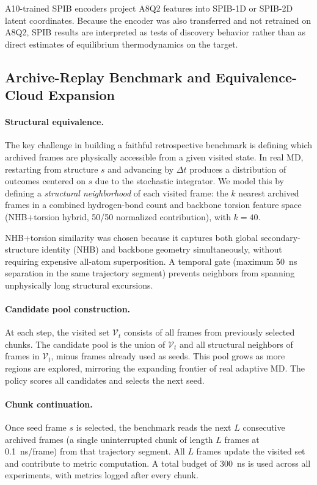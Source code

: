 A10-trained SPIB encoders project A8Q2 features into SPIB-1D or SPIB-2D latent coordinates.\cite{wang2021spib}
Because the encoder was also transferred and not retrained on A8Q2, SPIB results are interpreted as tests of discovery behavior rather than as direct estimates of equilibrium thermodynamics on the target.

\subsection{Archive-Replay Benchmark and Equivalence-Cloud Expansion}
\label{sec:methods_equiv}

\paragraph{Structural equivalence.}
The key challenge in building a faithful retrospective benchmark is defining which archived frames are physically accessible from a given visited state.
In real MD, restarting from structure $s$ and advancing by $\Delta t$ produces a distribution of outcomes centered on $s$ due to the stochastic integrator.
We model this by defining a \emph{structural neighborhood} of each visited frame: the $k$ nearest archived frames in a combined hydrogen-bond count and backbone torsion feature space (NHB+torsion hybrid, 50/50 normalized contribution), with $k=40$.

NHB+torsion similarity was chosen because it captures both global secondary-structure identity (NHB) and backbone geometry simultaneously, without requiring expensive all-atom superposition.
A temporal gate (maximum 50~ns separation in the same trajectory segment) prevents neighbors from spanning unphysically long structural excursions.

\paragraph{Candidate pool construction.}
At each step, the visited set $\mathcal{V}_t$ consists of all frames from previously selected chunks.
The candidate pool is the union of $\mathcal{V}_t$ and all structural neighbors of frames in $\mathcal{V}_t$, minus frames already used as seeds.
This pool grows as more regions are explored, mirroring the expanding frontier of real adaptive MD.
The policy scores all candidates and selects the next seed.

\paragraph{Chunk continuation.}
Once seed frame $s$ is selected, the benchmark reads the next $L$ consecutive archived frames (a single uninterrupted chunk of length $L$ frames at 0.1~ns/frame) from that trajectory segment.
All $L$ frames update the visited set and contribute to metric computation.
A total budget of 300~ns is used across all experiments, with metrics logged after every chunk.

